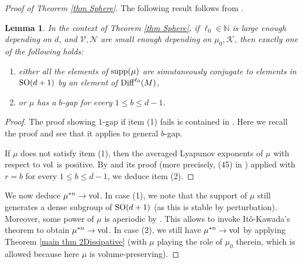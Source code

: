 \documentclass[11pt, leqno, fleqn]{amsart}
\newcommand{\margem}[1]{\marginpar{{\scriptsize {#1}}}}
\def\SO{   {\rm SO}}
\def\clr{   \color{red}}
\def \N{{\mathbb N}}
\newcommand{\cK}{{\mathcal K}}
\newcommand{\enmt}{\begin{enumerate}}
\newcommand{\eenmt}{\end{enumerate}}
\newtheorem{lemma}[thm]{\bf Lemma}
\theoremstyle{definition}
\theoremstyle{definition}
\def\supp{{\rm supp}}
\def \vol{  {\rm vol} }
\newcommand{\Diff}{{\rm Diff}}
\begin{document}
	\begin{proof}[Proof of Theorem \ref{thm Sphere}] 
		
				The following result follows from \cite{DK, DDZ}.
		\begin{lemma} In the context of Theorem \ref{thm Sphere}, if  $\ell_{0}\in \N$ is large enough depending on $d$, and $\mathcal{V}, \mathcal{N}$ are small enough depending on $\mu_{0}, \cK$, then exactly one of the following holds:
			\enmt
			\item either all the elements of $\supp(\mu)$ are simutaneously conjugate to elements in $\SO(d + 1)$ by an element of $\Diff^{\ell_{0}}(M)$,
			\item  or  $\mu$   has a $b$-gap  for every $1 \leq b \leq d - 1$. 
			\eenmt
		\end{lemma}
		
		
		\begin{proof} 		
			The proof showing $1$-gap if item (1) fails is contained in \cite[Prop 2.1]{DDZ}. Here we recall the proof and see that it applies to general $b$-gap.
			
			
		If $\mu$ does not satisfy item (1), then the averaged Lyapunov exponents of $\mu$ with respect to $\vol$ is positive.
		By  \cite[Corollary 4]{DK}   and its proof (more precisely, (45) in \cite[Proof of Corollary 4]{DK})  applied with $r = b$ for every $1 \leq b \leq d-1$,  we deduce item (2).
		\end{proof}
		
		
		
		
		
		We  now deduce $\mu^{*n}\rightarrow \vol$. In case (1), we note that the support of $\mu$ still generates a dense subgroup of $\SO(d+1)$ (as this is stable by perturbation). Moreover, some power of $\mu$ is aperiodic by \cite[Proposition 3.3]{BB}. This allows to invoke It\^o-Kawada's theorem \cite{IK} to obtain $\mu^{*n}\rightarrow \vol$. 
In case (2), we still have $\mu^{*n}\rightarrow \vol$ by applying Theorem \ref{main thm 2Dissipative} (with $\mu$ playing the role of $\mu_{0}$ therein, which is allowed because here $\mu$ is volume-preserving).
		
		
			\end{proof}
	
\end{document}
